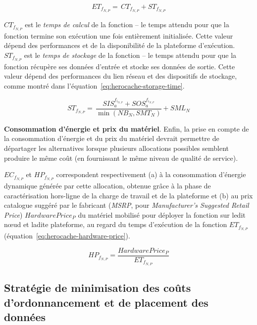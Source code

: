 {\begin{equation}
    {ET}_{{f}_{N, P}} = \, {CT}_{{f}_{N, P}} + {ST}_{{f}_{N, P}}
\label{eq:herocache-execution-time}
\end{equation}

${CT}_{{f}_{N, P}}$ est le \textit{temps de calcul} de la fonction -- le temps attendu pour que la fonction termine son exécution une fois entièrement initialisée. Cette valeur dépend des performances et de la disponibilité de la plateforme d'exécution. ${ST}_{{f}_{N, P}}$ est le \textit{temps de stockage} de la fonction -- le temps attendu pour que la fonction récupère ses données d'entrée et stocke ses données de sortie. Cette valeur dépend des performances du lien réseau et des dispositifs de stockage, comme montré dans l'équation~\ref{eq:herocache-storage-time}.

\begin{equation}
    {ST}_{{f}_{N, P}} = \, \frac{SIS_{a}^{f_{i_{N, P}}} + SOS_{a}^{f_{i_{N, P}}}}{\min (NB_{N}, SMT_{N})} + SML_{N}
\label{eq:herocache-storage-time}
\end{equation}

\textbf{Consommation d'énergie et prix du matériel}. Enfin, la prise en compte de la consommation d'énergie et du prix du matériel devrait permettre de départager les alternatives lorsque plusieurs allocations possibles semblent produire le même coût (en fournissant le même niveau de qualité de service).

${EC}_{{f}_{N, P}}$ et ${HP}_{{f}_{N, P}}$ correspondent respectivement (a) à la consommation d'énergie dynamique générée par cette allocation, obtenue grâce à la phase de caractérisation hors-ligne de la charge de travail et de la plateforme et (b) au prix catalogue suggéré par le fabricant (\textit{MSRP}, pour \textit{Manufacturer's Suggested Retail Price}) $Hardware Price_{P}$ du matériel mobilisé pour déployer la fonction sur ledit nœud et ladite plateforme, au regard du temps d'exécution de la fonction $ET_{{f}_{N, P}}$ (équation~\ref{eq:herocache-hardware-price}).

\begin{equation}
    {HP}_{{f}_{N, P}} = \frac{Hardware Price_{P}}{ET_{{f}_{N, P}}}
\label{eq:herocache-hardware-price}
\end{equation}

\subsection{Stratégie de minimisation des coûts d'ordonnancement et de placement des données}

}
